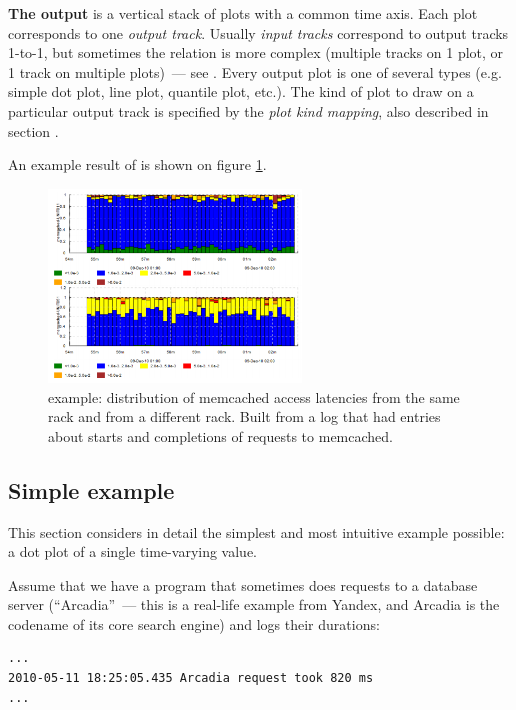 \documentclass{article}
\begin{document}
\textbf{The output} is a vertical stack of plots with a common time axis. Each plot corresponds to one \emph{output track}. Usually \emph{input tracks} correspond to output tracks 1-to-1, but sometimes the relation is more complex (multiple tracks on 1 plot, or 1 track on multiple plots)~--- see . Every output plot is one of several types (e.g. simple dot plot, line plot, quantile plot, etc.). The kind of plot to draw on a particular output track is specified by the \emph{plot kind mapping}, also described in section .

An example result of \timeplot{} is shown on figure \ref{fig:tplot-example}.

\begin{figure}[h]
\center
\includegraphics[width=0.6\textwidth]{pics/tplot/tplot-motivating-example.png}
\caption{\timeplot{} example: distribution of memcached access latencies from the same rack and from a different rack. Built from a log that had entries about starts and completions of requests to memcached.}
\label{fig:tplot-example}
\end{figure}

\pagebreak
\subsection{Simple example}
\label{sec:tplot-simple-example}
This section considers in detail the simplest and most intuitive example possible: a dot plot of a single time-varying value.

Assume that we have a program that sometimes does requests to a database server (``Arcadia''~--- this is a real-life example from Yandex, and Arcadia is the codename of its core search engine) and logs their durations:

\begin{verbatim}
...
2010-05-11 18:25:05.435 Arcadia request took 820 ms
...
\end{verbatim}
\end{document}
